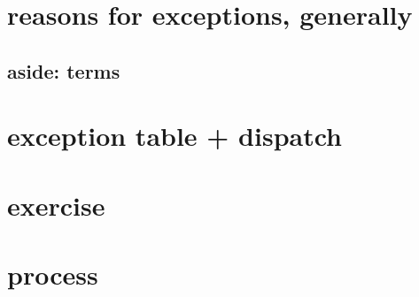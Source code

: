\section{reasons for exceptions, generally}


\subsection{aside: terms}


\section{exception table + dispatch}



\section{exercise}


\section{process}




